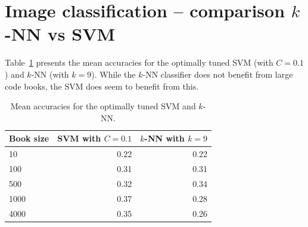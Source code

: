 \documentclass[a4paper,10pt]{article}
\begin{document}
\section{Image classification -- comparison $k$-NN vs SVM}
Table~\ref{t:svmvsknn} presents the mean accuracies for the optimally tuned SVM (with $C = 0.1$) and $k$-NN (with $k=9$).  While the $k$-NN classifier does not benefit from large code books, the SVM does seem to benefit from this.
\begin{table}
  \centering
  \begin{tabular}{l|rr}
    Book size & SVM with $C = 0.1$ & $k$-NN with $k = 9$ \\
    \hline
      10 & 0.22 & 0.22 \\
     100 & 0.31 & 0.31 \\
     500 & 0.32 & 0.34 \\
    1000 & 0.37 & 0.28 \\
    4000 & 0.35 & 0.26 \\
  \end{tabular}
  \caption{Mean accuracies for the optimally tuned SVM and $k$-NN.}
  \label{t:svmvsknn}
\end{table}

%
%
\end{document}
